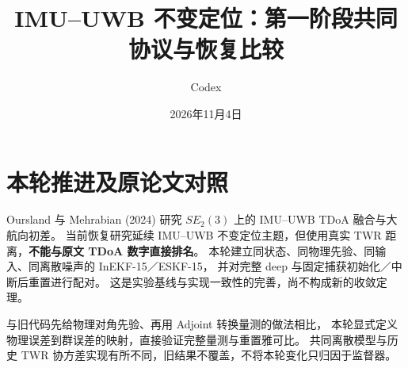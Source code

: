 \documentclass[11pt,a4paper]{ctexart}
\title{IMU--UWB 不变定位：第一阶段共同协议与恢复比较}
\author{Codex}
\date{2026年11月4日}
\begin{document}
\maketitle
\section{本轮推进及原论文对照}
Oursland 与 Mehrabian (2024) 研究 $SE_2(3)$ 上的 IMU--UWB TDoA 融合与大航向初差。
当前恢复研究延续 IMU--UWB 不变定位主题，但使用真实 TWR 距离，\textbf{不能与原文 TDoA 数字直接排名}。
本轮建立同状态、同物理先验、同输入、同离散噪声的 InEKF-15／ESKF-15，
并对完整 deep 与固定捕获初始化／中断后重置进行配对。
这是实验基线与实现一致性的完善，尚不构成新的收敛定理。

与旧代码先给物理对角先验、再用 Adjoint 转换量测的做法相比，
本轮显式定义物理误差到群误差的映射，直接验证完整量测与重置雅可比。
共同离散模型与历史 TWR 协方差实现有所不同，旧结果不覆盖，不将本轮变化只归因于监督器。
\end{document}
